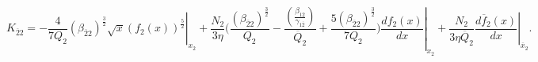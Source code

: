 \documentclass[fleqn]{article}
\begin{document}
            \begin{equation}
            K_{\overline{2}2} = - \left. \frac{4}{7Q_{2}}(\beta_{\overline{2}2})^\frac{3}{2}\sqrt{x}(f_{2}(x))^\frac{5}{2}\right|_{x_{2}}+\frac{N_{2}}{3\eta} \biggl(\frac{(\beta_{\overline{2}2})^\frac{3}{2}}{Q_{2}}-\frac{\left(\frac{\beta_{12}}{\gamma_{1\overline{2}}}\right)}{\overline{Q}_{2}} +\left. \frac{5(\beta_{\overline{2}2})^\frac{3}{2}}{7Q_{2}}\biggr)\frac{df_{2}(x)}{dx}\right|_{x_{2}} + \left. \frac{N_{2}}{3\eta \overline{Q}_{2}} \frac{d\overline{f}_{2}(x)}{dx}\right|_{\overline{x}_{2}}.
            \label{eqn:k2bar2_caseII}
            \end{equation} 
\end{document}
